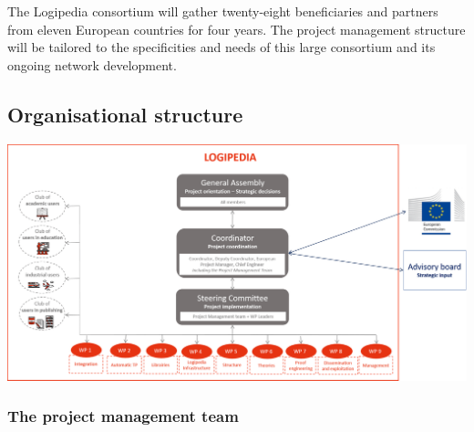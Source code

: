 The Logipedia consortium will gather twenty-eight beneficiaries and partners
from eleven European countries for four years. The project management
structure will be tailored to the specificities and needs of this
large consortium and its ongoing network development.

\subsection*{Organisational structure}

\includegraphics[width=\textwidth]{img/Gouvernance-reduced}

\subsubsection*{The project management team}

